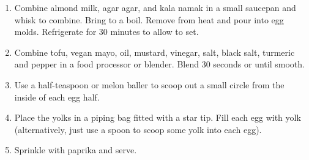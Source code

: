 \begin{footnotesize}
\begin{enumerate}
    \item Combine almond milk, agar agar, and kala namak in a small saucepan and whisk to combine. Bring to a boil. Remove
from heat and pour into egg molds. Refrigerate for 30 minutes to allow to set.
\item Combine tofu, vegan mayo, oil, mustard, vinegar, salt, black salt, turmeric and pepper in a food processor or blender.
Blend 30 seconds or until smooth.
\item Use a half-teaspoon or melon baller to scoop out a small circle from the inside of each egg half.
\item Place the yolks in a piping bag fitted with a star tip. Fill each egg with yolk (alternatively, just use a spoon to scoop some
yolk into each egg).
\item Sprinkle with paprika and serve.

\end{enumerate}
\end{footnotesize}

\vspace{2em}
